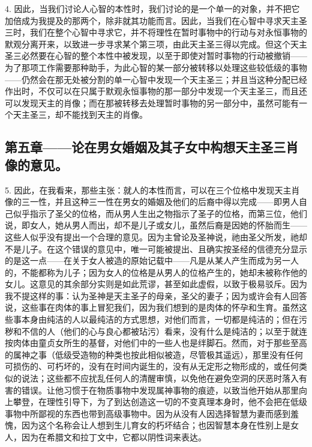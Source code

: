 4. 因此，当我们讨论人心智的本性时，我们讨论的是一个单一的对象，并不把它加倍成为我提及的那两个，除非就其功能而言。因此，当我们在心智中寻求天主圣三时，我们在整个心智中寻求它，并不将理性在暂时事物中的行动与对永恒事物的默观分离开来，以致进一步寻求某个第三项，由此天主圣三得以完成。但这个天主圣三必然要在心智的整个本性中被发现，以至于即使对暂时事物的行动被撤销——为了那项工作需要那种助手，为此心智的某一部分被转移以处理这些较低级的事物——仍然会在那无处被分割的单一心智中发现一个天主圣三；并且当这种分配已经作出时，不仅可以在只属于默观永恒事物的那一部分中发现一个天主圣三，而且还可以发现天主的肖像；而在那被转移去处理暂时事物的另一部分中，虽然可能有一个天主圣三，却不能找到天主的肖像。\par


\subsection{第五章——论在男女婚姻及其子女中构想天主圣三肖像的意见。}

5. 因此，在我看来，那些主张：就人的本性而言，可以在三个位格中发现天主肖像的三一性，并且这种三一性在男女的婚姻及他们的后裔中得以完成——即男人自己似乎指示了圣父的位格，而从男人生出之物指示了圣子的位格，而第三位，他们说，即女人，她从男人而出，却不是儿子或女儿，虽然后裔是因她的怀胎而生——这些人似乎没有提出一个合理的意见。因为主曾论及圣神说，祂由圣父所发，祂却不是儿子。在这个错误的意见中，唯一可能被提出、且确实按圣经的信德充分显示的是这一点——在关于女人被造的原始记载中——凡是从某人产生而成为另一人的，不能都称为儿子；因为女人的位格是从男人的位格产生的，她却未被称作他的女儿。这意见的其余部分实则是如此荒谬，甚至如此虚假，以致于极易驳斥。因为我不提这样的事：认为圣神是天主圣子的母亲，圣父的妻子；因为或许会有人回答说，这些事在肉体的事上冒犯我们，因为我们想到的是肉体的怀孕和生育。虽然这些事本身由纯洁的人以最纯洁的方式思想，对他们而言，一切都是纯洁的；但在污秽和不信的人（他们的心与良心都被玷污）看来，没有什么是纯洁的；以至于就连按肉体由童贞女所生的基督，对他们中的一些人也是绊脚石。然而，对于那些至高的属神之事（低级受造物的种类也按此相似被造，尽管极其遥远），那里没有任何可损伤的、可朽坏的，没有在时间内诞生的，没有从无定形之物形成的，或任何类似的说法；这些都不应扰乱任何人的清醒审慎，以免他在避免空洞的厌恶时落入有害的错误。让他习惯于在物质事物中发现属神事物的痕迹，以致当他开始从那里向上攀登，在理性引导下，为了到达创造这一切的不变真理本身时，他不会把在低级事物中所鄙视的东西也带到高级事物中。因为从没有人因选择智慧为妻而感到羞愧，因为这个名称会让人想到生儿育女的朽坏结合；也因智慧本身在性别上是女人，因为在希腊文和拉丁文中，它都以阴性词来表达。\par

